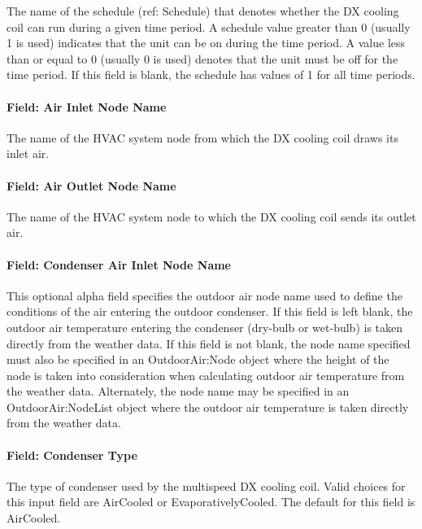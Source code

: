 The name of the schedule (ref: Schedule) that denotes whether the DX cooling coil can run during a given time period. A schedule value greater than 0 (usually 1 is used) indicates that the unit can be on during the time period. A value less than or equal to 0 (usually 0 is used) denotes that the unit must be off for the time period. If this field is blank, the schedule has values of 1 for all time periods.

\paragraph{Field: Air Inlet Node Name}\label{field-air-inlet-node-name-11}

The name of the HVAC system node from which the DX cooling coil draws its inlet air.

\paragraph{Field: Air Outlet Node Name}\label{field-air-outlet-node-name-11}

The name of the HVAC system node to which the DX cooling coil sends its outlet air.

\paragraph{Field: Condenser Air Inlet Node Name}\label{field-condenser-air-inlet-node-name-2}

This optional alpha field specifies the outdoor air node name used to define the conditions of the air entering the outdoor condenser. If this field is left blank, the outdoor air temperature entering the condenser (dry-bulb or wet-bulb) is taken directly from the weather data. If this field is not blank, the node name specified must also be specified in an OutdoorAir:Node object where the height of the node is taken into consideration when calculating outdoor air temperature from the weather data. Alternately, the node name may be specified in an OutdoorAir:NodeList object where the outdoor air temperature is taken directly from the weather data.

\paragraph{Field: Condenser Type}\label{field-condenser-type-2}

The type of condenser used by the multispeed DX cooling coil. Valid choices for this input field are AirCooled or EvaporativelyCooled. The default for this field is AirCooled.

